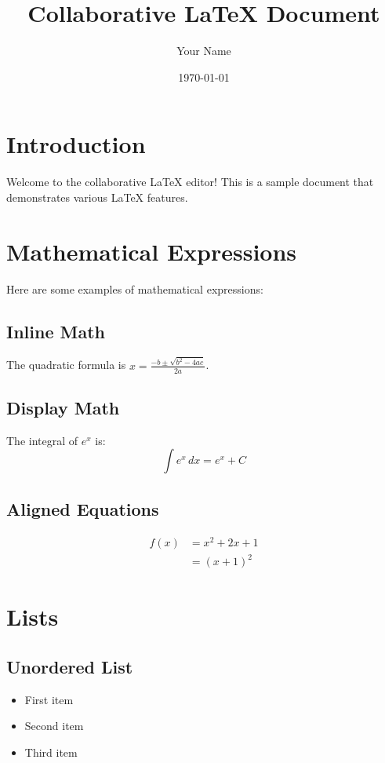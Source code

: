 \documentclass{article}
\title{Collaborative LaTeX Document}
\author{Your Name}
\date{\today}
\begin{document}
\maketitle

\tableofcontents

\section{Introduction}

Welcome to the collaborative LaTeX editor! This is a sample document that demonstrates various LaTeX features.

\section{Mathematical Expressions}

Here are some examples of mathematical expressions:

\subsection{Inline Math}
The quadratic formula is $x = \frac{-b \pm \sqrt{b^2 - 4ac}}{2a}$.

\subsection{Display Math}
The integral of $e^x$ is:
\[
\int e^x \, dx = e^x + C
\]

\subsection{Aligned Equations}
\begin{align}
f(x) &= x^2 + 2x + 1 \\
     &= (x + 1)^2
\end{align}

\section{Lists}

\subsection{Unordered List}
\begin{itemize}
    \item First item
    \item Second item
    \item Third item
\end{itemize}
\end{document}
